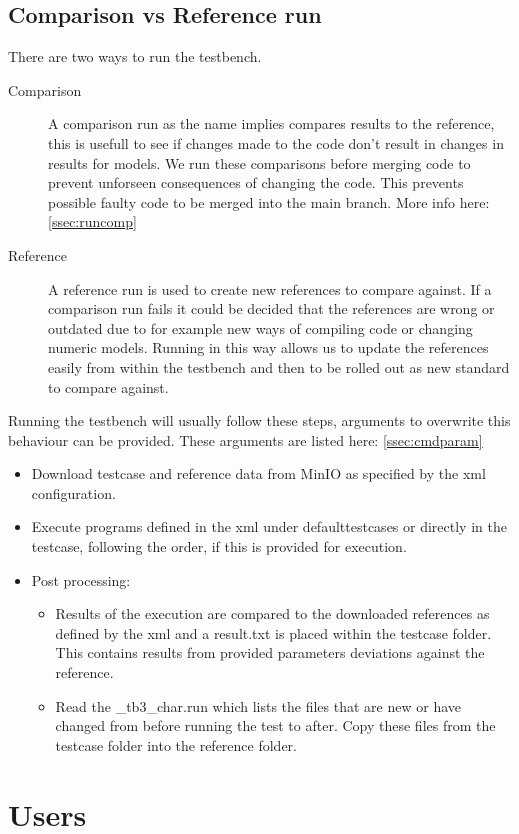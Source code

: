 \documentclass{deltares_memo}
\begin{document}
\subsection{Comparison vs Reference run}
There are two ways to run the testbench.
\begin{description}
\item[Comparison] A comparison run as the name implies compares results to the reference, this is usefull to see if changes made to the code don't result in changes in results for models. We run these comparisons before merging code to prevent unforseen consequences of changing the code. This prevents possible faulty code to be merged into the main branch. More info here: \autoref{ssec:runcomp}
\item[Reference] A reference run is used to create new references to compare against. If a comparison run fails it could be decided that the references are wrong or outdated due to for example new ways of compiling code or changing numeric models. Running in this way allows us to update the references easily from within the testbench and then to be rolled out as new standard to compare against.
\end{description}
Running the testbench will usually follow these steps, arguments to overwrite this behaviour can be provided. These arguments are listed here: \autoref{ssec:cmdparam}
\begin{itemize}
\item Download testcase and reference data from MinIO as specified by the xml configuration.
\item Execute programs defined in the xml under defaulttestcases or directly in the testcase, following the order, if this is provided for execution.
\item Post processing:
\begin{itemize}
\item[Comparison:] Results of the execution are compared to the downloaded references as defined by the xml and a result.txt is placed within the testcase folder. This contains results from provided parameters deviations against the reference.
\item[Reference:] Read the \_tb3\_char.run which lists the files that are new or have changed from before running the test to after. Copy these files from the testcase folder into the reference folder.
\end{itemize}
\end{itemize}

\newpage
\section{Users}
\end{document}
